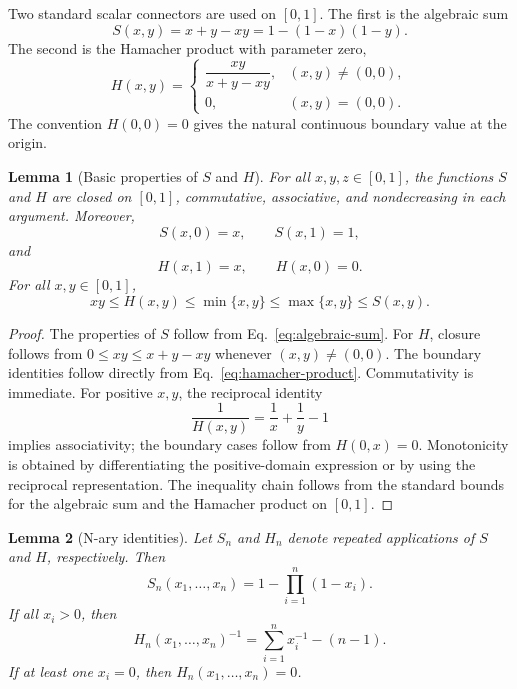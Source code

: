 \documentclass[reqno,final]{amsart}
\theoremstyle{definition}
\theoremstyle{plain}
\newtheorem{lemma}{Lemma}
\theoremstyle{remark}
\begin{document}
Two standard scalar connectors are used on \([0,1]\). The first is the algebraic sum
\begin{equation}
S(x,y)=x+y-xy=1-(1-x)(1-y).
\label{eq:algebraic-sum}
\end{equation}
The second is the Hamacher product with parameter zero,
\begin{equation}
H(x,y)=
\begin{cases}
\dfrac{xy}{x+y-xy}, & (x,y)\ne(0,0),\\[7pt]
0, & (x,y)=(0,0).
\end{cases}
\label{eq:hamacher-product}
\end{equation}
The convention \(H(0,0)=0\) gives the natural continuous boundary value at the origin.

\begin{lemma}[Basic properties of \(S\) and \(H\)]
\label{lem:basic-S-H}
For all \(x,y,z\in[0,1]\), the functions \(S\) and \(H\) are closed on \([0,1]\), commutative, associative, and nondecreasing in each argument. Moreover,
\[
S(x,0)=x,\qquad S(x,1)=1,
\]
and
\[
H(x,1)=x,\qquad H(x,0)=0.
\]
For all \(x,y\in[0,1]\),
\[
xy\le H(x,y)\le \min\{x,y\}\le \max\{x,y\}\le S(x,y).
\]
\end{lemma}

\begin{proof}
The properties of \(S\) follow from Eq.~\eqref{eq:algebraic-sum}. For \(H\), closure follows from \(0\le xy\le x+y-xy\) whenever \((x,y)\ne(0,0)\). The boundary identities follow directly from Eq.~\eqref{eq:hamacher-product}. Commutativity is immediate. For positive \(x,y\), the reciprocal identity
\[
\frac{1}{H(x,y)}=\frac{1}{x}+\frac{1}{y}-1
\]
implies associativity; the boundary cases follow from \(H(0,x)=0\). Monotonicity is obtained by differentiating the positive-domain expression or by using the reciprocal representation. The inequality chain follows from the standard bounds for the algebraic sum and the Hamacher product on \([0,1]\).
\end{proof}

\begin{lemma}[N-ary identities]
\label{lem:nary-identities}
Let \(S_n\) and \(H_n\) denote repeated applications of \(S\) and \(H\), respectively. Then
\begin{equation}
S_n(x_1,\ldots,x_n)=1-\prod_{i=1}^{n}(1-x_i).
\label{eq:nary-S}
\end{equation}
If all \(x_i>0\), then
\begin{equation}
H_n(x_1,\ldots,x_n)^{-1}=\sum_{i=1}^{n}x_i^{-1}-(n-1).
\label{eq:nary-H}
\end{equation}
If at least one \(x_i=0\), then \(H_n(x_1,\ldots,x_n)=0\).
\end{lemma}
\end{document}
